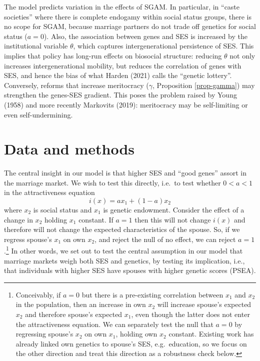 \documentclass[
  12pt,
]{article}
\theoremstyle{definition}
\theoremstyle{definition}
\theoremstyle{definition}
\theoremstyle{definition}
\theoremstyle{remark}
\begin{document}
The model predicts variation in the effects of SGAM. In particular, in
``caste societies'' where there is complete endogamy within social status
groups, there is no scope for SGAM, because marriage partners do not trade off
genetics for social status (\(a = 0\)). Also, the association between genes and
SES is increased by the institutional variable \(\theta\), which captures
intergenerational persistence of SES. This implies that policy has long-run
effects on biosocial structure: reducing \(\theta\) not only increases
intergenerational mobility, but reduces the correlation of genes with SES, and
hence the bias of what Harden (2021) calls the ``genetic lottery''.
Conversely, reforms that increase meritocracy (\(\gamma\), Proposition
\ref{prop-gamma}) may strengthen the genes-SES gradient. This poses the problem
raised by Young (1958) and more recently Markovits (2019): meritocracy
may be self-limiting or even self-undermining.

\section{Data and methods}\label{data-and-methods}

The central insight in our model is that higher SES and ``good genes''
assort in the marriage market. We wish to test this directly, i.e.~to
test whether \(0 < a < 1\) in the attractiveness equation
\[i(x) = a x_1 + (1-a) x_2\] where \(x_2\) is social status and \(x_1\) is
genetic endowment. Consider the effect of a change in \(x_2\) holding
\(x_1\) constant. If \(a = 1\) then this will not change \(i(x)\) and
therefore will not change the expected characteristics of the spouse.
So, if we regress spouse's \(x_1\) on own \(x_2\), and reject the null of no
effect, we can reject \(a = 1\).\footnote{Conceivably, if \(a = 0\) but there is a pre-existing correlation
  between \(x_1\) and \(x_2\) in the population, then an increase in own
  \(x_2\) will increase spouse's expected \(x_2\) and therefore spouse's
  expected \(x_1\), even though the latter does not enter the
  attractiveness equation. We can separately test the null that
  \(a = 0\) by regressing spouse's \(x_2\) on own \(x_1\), holding own \(x_2\)
  constant. Existing work has already linked own genetics to spouse's
  SES, e.g.~education, so we focus on the other direction and treat
  this direction as a robustness check below.} In other words, we set out to test
the central assumption in our model that marriage markets weigh both SES
and genetics, by testing its implication, i.e., that individuals with
higher SES have spouses with higher genetic scores (PSEA).
\end{document}
